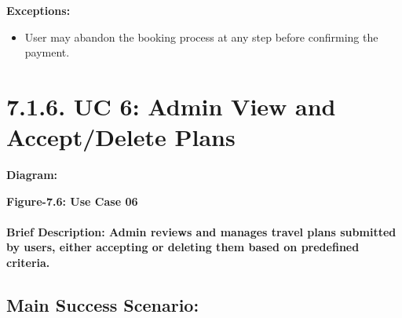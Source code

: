 \documentclass{scrreprt}
\begin{document}
\textbf{Exceptions:}
\begin{itemize}
    \item User may abandon the booking process at any step before confirming the payment.
\end{itemize}


\section*{\textbf{7.1.6. UC 6: Admin View and Accept/Delete Plans}}
\textbf{Diagram:}
\newline
\newline

\begin{center}
    \parbox{0.8\textwidth}{ 
        \centering
       
    }
\end{center}
\begin{center}
    \parbox{0.8\textwidth}{ 
        \centering
        \textbf{Figure-7.6: Use Case 06}
    }
\end{center}

\paragraph {\textnormal{Brief Description: 
Admin reviews and manages travel plans submitted by users, either accepting or deleting them based on predefined criteria.}}


\subsection*{\textbf{Main Success Scenario:}}
\end{document}
